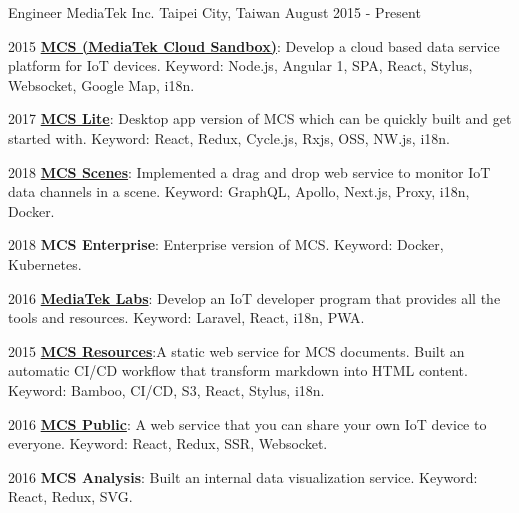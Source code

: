 

\begin{cventries}

  \cventry
    {Engineer} %
    {MediaTek Inc.} %
    {Taipei City, Taiwan} %
    {August 2015 - Present} %
    {
      \begin{cvitems} %
        \item {2015 \href{https://mcs.mediatek.com}{\textbf{MCS (MediaTek Cloud Sandbox)}}: Develop a cloud based data service platform for IoT devices. Keyword: Node.js, Angular 1, SPA, React, Stylus, Websocket, Google Map, i18n.}
        \item {2017 \href{https://mcslite.netlify.com/}{\textbf{MCS Lite}}: Desktop app version of MCS which can be quickly built and get started with. Keyword: React, Redux, Cycle.js, Rxjs, OSS, NW.js, i18n.}
        \item {2018 \href{https://medium.com/mediatekcloudsandbox/\%E5\%A6\%82\%E4\%BD\%95\%E9\%80\%8F\%E9\%81\%8E-scene-\%E5\%A0\%B4\%E6\%99\%AF-\%E5\%8A\%9F\%E8\%83\%BD\%E5\%BF\%AB\%E9\%80\%9F\%E6\%89\%93\%E9\%80\%A0\%E7\%89\%A9\%E8\%81\%AF\%E7\%B6\%B2\%E6\%87\%89\%E7\%94\%A8-1-d10d0d687742}{\textbf{MCS Scenes}}: Implemented a drag and drop web service to monitor IoT data channels in a scene. Keyword: GraphQL, Apollo, Next.js, Proxy, i18n, Docker.}
        \item {2018 \textbf{MCS Enterprise}: Enterprise version of MCS. Keyword: Docker, Kubernetes.}
        \item {2016 \href{https://labs.mediatek.com}{\textbf{MediaTek Labs}}: Develop an IoT developer program that provides all the tools and resources. Keyword: Laravel, React, i18n, PWA.}
        \item {2015 \href{https://mcs.mediatek.com/resources/latest/introduction}{\textbf{MCS Resources}}:A static web service for MCS documents. Built an automatic CI/CD workflow that transform markdown into HTML content. Keyword: Bamboo, CI/CD, S3, React, Stylus, i18n.}
        \item {2016 \href{https://medium.com/mediatekcloudsandbox/\%E5\%B0\%87\%E6\%82\%A8\%E7\%9A\%84\%E8\%A3\%9D\%E7\%BD\%AE\%E8\%A8\%AD\%E7\%82\%BA\%E5\%85\%AC\%E9\%96\%8B\%E4\%B8\%A6\%E5\%88\%86\%E4\%BA\%AB\%E7\%B5\%A6\%E4\%BB\%BB\%E4\%BD\%95\%E4\%BA\%BA\%E7\%80\%8F\%E8\%A6\%BD-a96d47ba5859}{\textbf{MCS Public}}: A web service that you can share your own IoT device to everyone. Keyword: React, Redux, SSR, Websocket.}
        \item {2016 \textbf{MCS Analysis}: Built an internal data visualization service. Keyword: React, Redux, SVG.}
      \end{cvitems}
    }


\end{cventries}
